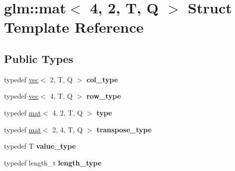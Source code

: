 \hypertarget{structglm_1_1mat_3_014_00_012_00_01T_00_01Q_01_4}{}\section{glm\+:\+:mat$<$ 4, 2, T, Q $>$ Struct Template Reference}
\label{structglm_1_1mat_3_014_00_012_00_01T_00_01Q_01_4}
\subsection*{Public Types}
\begin{DoxyCompactItemize}
\item 
\mbox{\label{structglm_1_1mat_3_014_00_012_00_01T_00_01Q_01_4_a60138ab077eb3bef96e654e672af5059}} 
typedef \hyperlink{structglm_1_1vec}{vec}$<$ 2, T, Q $>$ {\bfseries col\+\_\+type}
\item 
\mbox{\label{structglm_1_1mat_3_014_00_012_00_01T_00_01Q_01_4_a33d6c2074d5507b728a6e2e91a84f6a8}} 
typedef \hyperlink{structglm_1_1vec}{vec}$<$ 4, T, Q $>$ {\bfseries row\+\_\+type}
\item 
\mbox{\label{structglm_1_1mat_3_014_00_012_00_01T_00_01Q_01_4_aecca78e9fbf467c7558b6018401c3f29}} 
typedef \hyperlink{structglm_1_1mat}{mat}$<$ 4, 2, T, Q $>$ {\bfseries type}
\item 
\mbox{\label{structglm_1_1mat_3_014_00_012_00_01T_00_01Q_01_4_ab74329af13d01d0d1bdac3ea3619fc68}} 
typedef \hyperlink{structglm_1_1mat}{mat}$<$ 2, 4, T, Q $>$ {\bfseries transpose\+\_\+type}
\item 
\mbox{\label{structglm_1_1mat_3_014_00_012_00_01T_00_01Q_01_4_aad6b55a7bcab7ce036cd5d5f5b963c6e}} 
typedef T {\bfseries value\+\_\+type}
\item 
\mbox{\label{structglm_1_1mat_3_014_00_012_00_01T_00_01Q_01_4_a4b192a2630331f70ca61657d9783026e}} 
typedef length\+\_\+t {\bfseries length\+\_\+type}
\end{DoxyCompactItemize}
